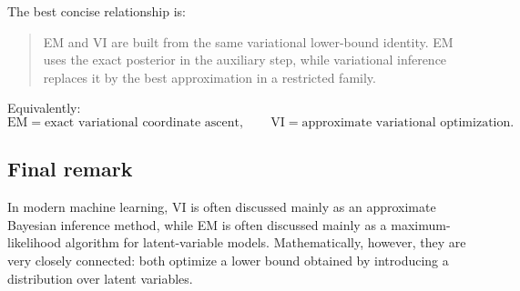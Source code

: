 The best concise relationship is:
\begin{quote}
EM and VI are built from the same variational lower-bound identity. EM uses the exact posterior in the auxiliary step, while variational inference replaces it by the best approximation in a restricted family.
\end{quote}

Equivalently:
\[
\boxed{
\text{EM} = \text{exact variational coordinate ascent},
\qquad
\text{VI} = \text{approximate variational optimization}.
}
\]

\subsection{Final remark}

In modern machine learning, VI is often discussed mainly as an approximate Bayesian inference method, while EM is often discussed mainly as a maximum-likelihood algorithm for latent-variable models. Mathematically, however, they are very closely connected: both optimize a lower bound obtained by introducing a distribution over latent variables.
